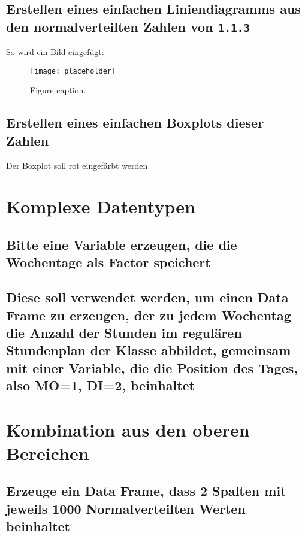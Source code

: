 \documentclass{article}
\begin{document}
\subsection{Erstellen eines einfachen Liniendiagramms aus den normalverteilten Zahlen von \texttt{1.1.3}}

So wird ein Bild eingefügt:

\begin{figure}[H]
	\begin{center}
		\texttt{[image: placeholder]} %
		\caption{Figure caption.}
	\end{center}
\end{figure}

\subsection{Erstellen eines einfachen Boxplots dieser Zahlen}


Der Boxplot soll rot eingefärbt werden


\section{Komplexe Datentypen}

\subsection{Bitte eine Variable erzeugen, die die Wochentage als Factor speichert}

\subsection{Diese soll verwendet werden, um einen Data Frame zu erzeugen, der zu jedem Wochentag die Anzahl der Stunden im regulären Stundenplan der Klasse abbildet, gemeinsam mit einer Variable, die die Position des Tages, also MO=1, DI=2, beinhaltet}


\section{Kombination aus den oberen Bereichen}

\subsection{Erzeuge ein Data Frame, dass 2 Spalten mit jeweils 1000 Normalverteilten Werten beinhaltet}
\end{document}
